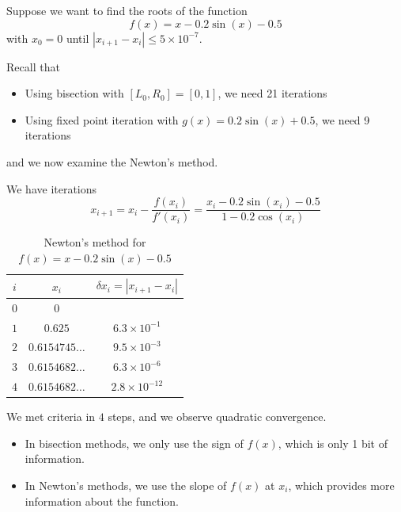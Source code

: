 \begin{example}
    Suppose we want to find the roots of the function \[
        f(x) = x - 0.2\sin(x) - 0.5
    \] with \( x_0 = 0 \) until \( |x_{i+1} - x_i| \leq 5 \times 10^{-7} \).

    Recall that
    \begin{itemize}
        \item Using bisection with \( [L_0, R_0] = [0, 1] \), we need 21 iterations
        \item Using fixed point iteration with \( g(x) = 0.2 \sin(x) + 0.5 \), we need 9 iterations
    \end{itemize} and we now examine the Newton's method.

    We have iterations \[
        x_{i+1}
        = x_i - \frac{f(x_i)}{f'(x_i)}
        = \frac{x_i - 0.2\sin(x_i) - 0.5}{1 - 0.2\cos(x_i)}
    \]

    \begin{table}[H]
        \centering
        \begin{tabular}{c|c|c}
            \( i \)
             & \( x_i \)
             & \( \delta x_i = | x_{i+1} - x_i | \)
            \\ \hline \hline
            \(0\)
             & \(0\)
             &                                      \\
            \(1\)
             & \(0.625\)
             & \(6.3\times10^{-1}\)                 \\
            \(2\)
             & \(0.6154745\ldots\)
             & \(9.5\times10^{-3}\)                 \\
            \(3\)
             & \(0.6154682\ldots\)
             & \(6.3\times10^{-6}\)                 \\
            \(4\)
             & \(0.6154682\ldots\)
             & \(2.8\times10^{-12}\)                \\
        \end{tabular}
        \caption{Newton's method for \( f(x) = x - 0.2 \sin(x) - 0.5 \)}
    \end{table}

    \begin{note}
        We met criteria in \( 4 \) steps, and we observe quadratic convergence.

        \begin{itemize}
            \item In bisection methods, we only use the sign of \( f(x) \), which is only 1 bit of information.
            \item In Newton's methods, we use the slope of \( f(x) \) at \( x_i \), which provides more information about the function.
        \end{itemize}
    \end{note}
\end{example}